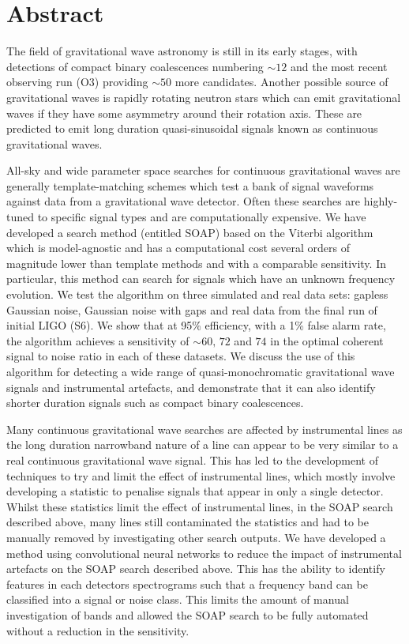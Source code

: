 \chapter{Abstract}

The field of gravitational wave astronomy is still in its early stages, with
detections of compact binary coalescences numbering $\sim
12$ and the most recent observing run (O3) providing $\sim 50$ more candidates. Another possible source of
gravitational waves is rapidly rotating neutron stars which can emit gravitational waves if they have some asymmetry
around their rotation axis.
These are predicted to emit long duration quasi-sinusoidal signals known as
continuous gravitational waves.

All-sky and wide parameter space searches for continuous gravitational waves
are generally template-matching schemes which test a bank of signal waveforms
against data from a gravitational wave detector.  Often these searches  are highly-tuned to specific signal types and are computationally
expensive. We have developed a search method (entitled SOAP) based on the Viterbi
algorithm which is model-agnostic and has a computational cost several orders
of magnitude lower than template methods and with a comparable sensitivity. 
In particular, this method can search for
signals which have an unknown frequency evolution. We test the algorithm on
three simulated and real data sets: gapless Gaussian noise, Gaussian noise with
gaps and real data from the final run of initial LIGO (S6). We show that at
95\% efficiency, with a 1\% false alarm rate, the algorithm achieves a sensitivity of $\sim 60,\, 72$ and $74$ in the optimal coherent signal to noise ratio in each of these datasets.
We discuss the use of this algorithm for detecting a wide range of quasi-monochromatic
gravitational wave signals and instrumental artefacts, and
demonstrate that it can also identify shorter duration signals such as compact binary coalescences.


Many continuous gravitational wave searches are affected by instrumental lines
as the long duration narrowband nature of a line can appear to be very similar
to a real continuous gravitational wave signal.  This has led
to the development of techniques to try and limit the effect of
instrumental lines, which mostly involve developing a statistic to penalise
signals that appear in only a single detector.  
Whilst these statistics limit the effect of instrumental lines, in the SOAP search described above, many lines still contaminated the statistics and had to be manually removed by investigating other search outputs.
We have developed a method using convolutional neural networks to reduce the impact of instrumental
artefacts on the SOAP search described above.  This has the
ability to identify features in each detectors spectrograms such that a
frequency band can be classified into a signal or noise class.  
This limits the amount of manual investigation of bands and allowed the SOAP search to be fully automated without a reduction in the sensitivity.



